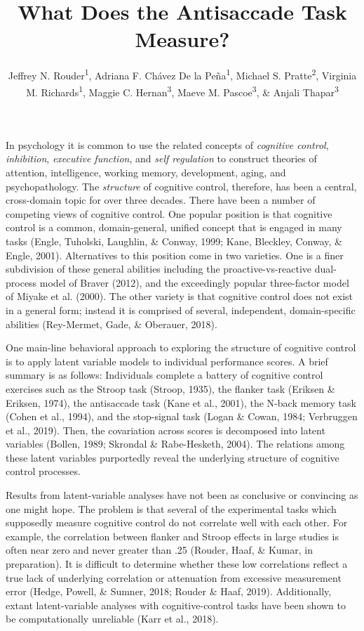 \documentclass[
  ,man,floatsintext]{apa6}
\title{What Does the Antisaccade Task Measure?}
\author{Jeffrey N. Rouder\textsuperscript{1}, Adriana F. Chávez De la Peña\textsuperscript{1}, Michael S. Pratte\textsuperscript{2}, Virginia M. Richards\textsuperscript{1}, Maggie C. Hernan\textsuperscript{3}, Maeve M. Pascoe\textsuperscript{3}, \& Anjali Thapar\textsuperscript{3}}
\date{}
\affiliation{\vspace{0.5cm}\textsuperscript{1} University of California, Irvine\\\textsuperscript{2} Mississippi State University\\\textsuperscript{3} Bryn Mawr College}
\begin{document}
\maketitle

In psychology it is common to use the related concepts of \emph{cognitive control}, \emph{inhibition}, \emph{executive function}, and \emph{self regulation} to construct theories of attention, intelligence, working memory, development, aging, and psychopathology. The \emph{structure} of cognitive control, therefore, has been a central, cross-domain topic for over three decades. There have been a number of competing views of cognitive control. One popular position is that cognitive control is a common, domain-general, unified concept that is engaged in many tasks (Engle, Tuholski, Laughlin, \& Conway, 1999; Kane, Bleckley, Conway, \& Engle, 2001). Alternatives to this position come in two varieties. One is a finer subdivision of these general abilities including the proactive-vs-reactive dual-process model of Braver (2012), and the exceedingly popular three-factor model of Miyake et al. (2000). The other variety is that cognitive control does not exist in a general form; instead it is comprised of several, independent, domain-specific abilities (Rey-Mermet, Gade, \& Oberauer, 2018).

One main-line behavioral approach to exploring the structure of cognitive control is to apply latent variable models to individual performance scores. A brief summary is as follows: Individuals complete a battery of cognitive control exercises such as the Stroop task (Stroop, 1935), the flanker task (Eriksen \& Eriksen, 1974), the antisaccade task (Kane et al., 2001), the N-back memory task (Cohen et al., 1994), and the stop-signal task (Logan \& Cowan, 1984; Verbruggen et al., 2019). Then, the covariation across scores is decomposed into latent variables (Bollen, 1989; Skrondal \& Rabe-Hesketh, 2004). The relations among these latent variables purportedly reveal the underlying structure of cognitive control processes.

Results from latent-variable analyses have not been as conclusive or convincing as one might hope. The problem is that several of the experimental tasks which supposedly measure cognitive control do not correlate well with each other. For example, the correlation between flanker and Stroop effects in large studies is often near zero and never greater than .25 (Rouder, Haaf, \& Kumar, in preparation). It is difficult to determine whether these low correlations reflect a true lack of underlying correlation or attenuation from excessive measurement error (Hedge, Powell, \& Sumner, 2018; Rouder \& Haaf, 2019). Additionally, extant latent-variable analyses with cognitive-control tasks have been shown to be computationally unreliable (Karr et al., 2018).
\end{document}
